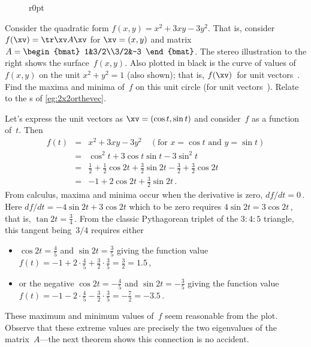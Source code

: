 \begin{wrapfigure}r{0pt}
\end{wrapfigure}
\begin{example} 
Consider the quadratic form \(f(x,y)=x^2+3xy-3y^2\). 
That is, consider \(f(\xv)=\tr\xv A\xv\) for \(\xv=(x,y)\) and matrix \(A=\begin{bmat} 1&3/2\\3/2&-3 \end{bmat}\).
The stereo illustration to the right shows the surface~\(f(x,y)\).
Also plotted in black is the curve of values of~\(f(x,y)\) on the unit  \(x^2+y^2=1\) (also shown); that is, \(f(\xv)\)~for unit vectors~\xv.
Find the maxima and minima of~\(f\) on this unit circle (for unit vectors~\xv).
Relate to the s of \cref{eg:2x2orthevec}.

\begin{solution} 
Let's express the unit vectors as \(\xv=(\cos t,\sin t)\) and consider~\(f\) as a function of~\(t\).
Then 
\begin{eqnarray*}
f(t)&=&x^2+3xy-3y^2\quad(\text{for }x=\cos t\text{ and }y=\sin t)
\\&=&\cos^2t+3\cos t\sin t-3\sin^2t
\\&=&\tfrac12+\tfrac12\cos2t+\tfrac32\sin2t -\tfrac32+\tfrac32\cos2t
\\&=&-1+2\cos2t+\tfrac32\sin2t\,.
\end{eqnarray*}
From calculus, maxima and minima occur when the derivative is zero, \(df/dt=0\)\,.
Here \(df/dt=-4\sin2t+3\cos2t\) which to be zero requires \(4\sin2t=3\cos2t\)\,, that is, \(\tan2t=\tfrac34\)\,.
From the classic Pythagorean triplet of the \(3:4:5\) triangle, this tangent being~\(3/4\) requires either \begin{itemize}
\item \(\cos2t=\tfrac45\) and \(\sin2t=\tfrac35\) giving the function value \(f(t)=-1+2\cdot\tfrac45+\tfrac32\cdot\tfrac35
=\tfrac32=1.5\)\,,
\item or the negative \(\cos2t=-\tfrac45\) and \(\sin2t=-\tfrac35\) giving the function value \(f(t)=-1-2\cdot\tfrac45-\tfrac32\cdot\tfrac35
=-\tfrac72=-3.5\)\,.
\end{itemize}
These maximum and minimum values of~\(f\) seem reasonable from the plot.
Observe that these extreme values are precisely the two eigenvalues of the matrix~\(A\)---the next theorem shows this connection is no accident.
\end{solution}
\end{example}






